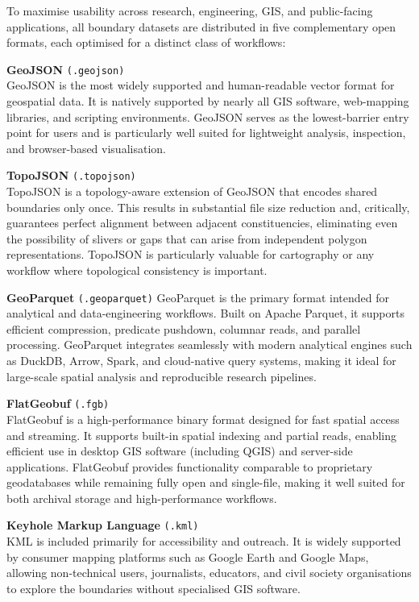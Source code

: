 \documentclass[11pt]{article}
\begin{document}
To maximise usability across research, engineering, GIS, and public-facing applications, all boundary datasets are distributed in five complementary open formats, each optimised for a distinct class of workflows:
\begin{enumbul}
	\item \textbf{GeoJSON} \texttt{(.geojson)}\\
	GeoJSON is the most widely supported and human-readable vector format for geospatial data. It is natively supported by nearly all GIS software, web-mapping libraries, and scripting environments. GeoJSON serves as the lowest-barrier entry point for users and is particularly well suited for lightweight analysis, inspection, and browser-based visualisation.
	\item \textbf{TopoJSON} \texttt{(.topojson)}\\
	TopoJSON is a topology-aware extension of GeoJSON that encodes shared boundaries only once. This results in substantial file size reduction and, critically, guarantees perfect alignment between adjacent constituencies, eliminating even the possibility of slivers or gaps that can arise from independent polygon representations. TopoJSON is particularly valuable for cartography or any workflow where topological consistency is important.
	\item \textbf{GeoParquet} \texttt{(.geoparquet)}
	GeoParquet is the primary format intended for analytical and data-engineering workflows. Built on Apache Parquet, it supports efficient compression, predicate pushdown, columnar reads, and parallel processing. GeoParquet integrates seamlessly with modern analytical engines such as DuckDB, Arrow, Spark, and cloud-native query systems, making it ideal for large-scale spatial analysis and reproducible research pipelines.
	\item \textbf{FlatGeobuf} \texttt{(.fgb)}\\
	FlatGeobuf is a high-performance binary format designed for fast spatial access and streaming. It supports built-in spatial indexing and partial reads, enabling efficient use in desktop GIS software (including QGIS) and server-side applications. FlatGeobuf provides functionality comparable to proprietary geodatabases while remaining fully open and single-file, making it well suited for both archival storage and high-performance workflows.
	\item \textbf{Keyhole Markup Language} \texttt{(.kml)}\\
	KML is included primarily for accessibility and outreach. It is widely supported by consumer mapping platforms such as Google Earth and Google Maps, allowing non-technical users, journalists, educators, and civil society organisations to explore the boundaries without specialised GIS software.
\end{enumbul}
\end{document}
